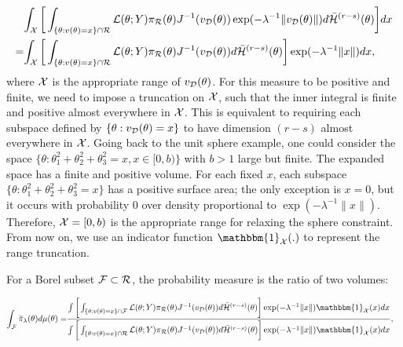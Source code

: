\documentclass[10pt,fleqn]{article}
\DeclareMathOperator{\1}{\mathbbm{1}} \DeclareMathOperator{\bigO}{\mc O}
\begin{document}
\begin{equation}
\begin{aligned}
& {\int_{\mathcal{X}}
\bigg[ \int_{ \{\theta:v(\theta)=x\} \cap \mathcal{R} }
{\mathcal{L}(\theta;Y)\pi_\mathcal{R}(\theta)}{J^{-1}(v_\mathcal{D}(\theta))
} \exp(-{\lambda^{-1}}\| v_{\mathcal{D}}(\theta) \|) 
d\bar{\mathcal{H}}^{(r-s)}(\theta) \bigg]        dx
} \\
= &{\int_{\mathcal{X}}
\bigg[ \int_{ \{\theta:v(\theta)=x\} \cap \mathcal{R} }
{\mathcal{L}(\theta;Y)\pi_\mathcal{R}(\theta)}{J^{-1}(v_\mathcal{D}(\theta))
}
d\bar{\mathcal{H}}^{(r-s)}(\theta) \bigg]     \exp(-{\lambda^{-1}}\|x\|)    dx
},
\end{aligned}
\end{equation}
where $\mathcal{X}$ is the appropriate range of $v_{\mathcal{D}}(\theta)$.  For this measure to be positive and finite, we need to impose a
truncation on $\mathcal{X}$, such that the inner integral is finite and positive
almost everywhere in $\mathcal{X}$. This is equivalent to requiring each subspace defined
by $\{\theta:v_{\mathcal{D}}(\theta)=x\}$ to have dimension $(r-s)$ almost
everywhere in $\mathcal{X}$. Going back to the unit sphere example, one could consider the space $\{\theta: \theta_1^2+ \theta_2^2 + \theta_3^2=x, x\in[0, b)\}$ with $b>1$ large but finite. The expanded space has a finite and positive volume. For each fixed $x$, each subspace $\{\theta: \theta_1^2+ \theta_2^2 + \theta_3^2=x\}$ has a positive surface area; the only exception is $x=0$, but it occurs with probability $0$ over density proportional to  $\exp(-{\lambda^{-1}}\|x\|)$. Therefore, $\mathcal{X}=[0,b)$ is the appropriate range for relaxing the sphere constraint. From now on, we use an indicator function $\mathbbm{1}_{\mc X}(.)$ to represent the range truncation.

For a Borel subset $\mathcal{F} \subset \mathcal{R}$, the probability measure is the ratio of two volumes:

\begin{equation}
\begin{aligned}
\int_{\mc F} \tilde{\pi}_\lambda(\theta) d \mu(\theta)= & \frac{\int
\bigg[ \int_{ \{\theta:v(\theta)=x\}\cap \mc F }
{\mathcal{L}(\theta;Y)\pi_\mathcal{R}(\theta)}{J^{-1}(v_\mathcal{D}(\theta))
}
d\bar{\mathcal{H}}^{(r-s)}(\theta) \bigg]  \exp(-{\lambda^{-1}}\|x\|) \mathbbm{1}_{\mc X}(x) dx
}
{\int\bigg[ \int_{ \{\theta:v(\theta)=x\} \cap \mc R}
{\mathcal{L}(\theta;Y)\pi_\mathcal{R}(\theta)}{J^{-1}(v_\mathcal{D}(\theta))
}
d\bar{\mathcal{H}}^{(r-s)}(\theta) \bigg]     \exp(-{\lambda^{-1}}\|x\|)   \mathbbm{1}_{\mc X}(x) dx
},
\end{aligned}
\end{equation}
\end{document}
